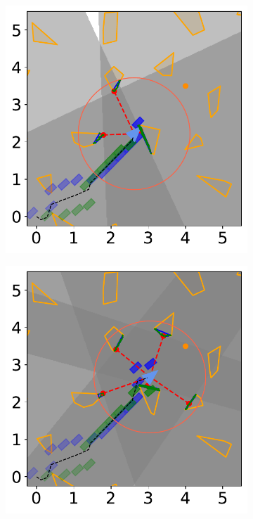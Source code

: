 \begin{figure}[H]
    \begin{subfigure}{0.30\textwidth}
        \centering
        \includegraphics[width=\textwidth]{figures/Simulations/sim2unkenv/frame_6.pdf}
    \end{subfigure}%
    \hspace{1em}
    \begin{subfigure}{0.30\textwidth}
        \centering
        \includegraphics[width=\textwidth]{figures/Simulations/sim2unkenv/frame_7.pdf}
    \end{subfigure}%


\end{figure}
